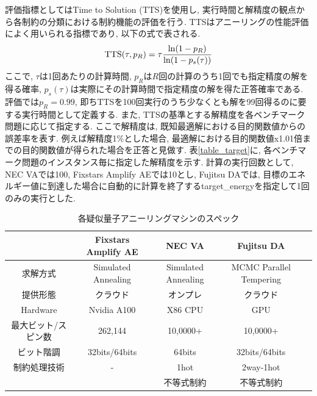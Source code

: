 \documentclass[submit,techrep,noauthor]{ipsj}
\begin{document}
評価指標としてはTime to Solution (TTS)を使用し, 実行時間と解精度の観点から各制約の分類における制約機能の評価を行う. TTSはアニーリングの性能評価によく用いられる指標であり, 以下の式で表される.
\begin{equation}
{\rm{TTS}}(\tau, p_{R}) = \tau\frac{{\rm{ln}}(1-p_{R})}{{\rm{ln}}(1-p_{s}(\tau))} \label{tts_def}
\end{equation}
ここで, $\tau$は1回あたりの計算時間, $p_{R}$は$R$回の計算のうち1回でも指定精度の解を得る確率, $p_{s}(\tau)$は実際にその計算時間で指定精度の解を得た正答確率である. 評価では$p_{R}=0.99$, 即ちTTSを100回実行のうち少なくとも解を99回得るのに要する実行時間として定義する. また, TTSの基準とする解精度を各ベンチマーク問題に応じて指定する. ここで解精度は, 既知最適解における目的関数値からの誤差率を表す. 例えば解精度1\%とした場合, 最適解における目的関数値x1.01倍までの目的関数値が得られた場合を正答と見做す. 表\ref{table_target}に, 各ベンチマーク問題のインスタンス毎に指定した解精度を示す. 計算の実行回数として, NEC VAでは100, Fixstars Amplify AEでは10とし, Fujitsu DAでは, 目標のエネルギー値に到達した場合に自動的に計算を終了するtarget\_energyを指定して1回のみの実行とした. 

\newlength{\myheight}
\setlength{\myheight}{0.8cm}

\begin{table}[htb]
\centering
  \caption{各疑似量子アニーリングマシンのスペック}
    \begin{tabular}{|c||c|c|c|c}
      \hline
      \parbox[c][\myheight][c]{0cm}{}
      & \parbox{10em}{Fixstars Amplify AE} & {NEC VA} & {Fujitsu DA}\\ \hline \hline
      求解方式 & Simulated Annealing & Simulated Annealing & MCMC Parallel Tempering\\ \hline
      提供形態 & クラウド & オンプレ & クラウド\\ \hline
      Hardware & Nvidia A100 & X86 CPU & GPU\\ \hline
      最大ビット/スピン数 & 262,144 & 10,0000+ & 10,0000+\\ \hline
      ビット階調 & 32bits/64bits & 64bits & 32bits/64bits\\ \hline
      制約処理技術 & - & 1hot & 2way-1hot\\ 
      {} & {} & 不等式制約 & 不等式制約\\ \hline
  \end{tabular}
\label{table_spec}
\end{table}
\end{document}
